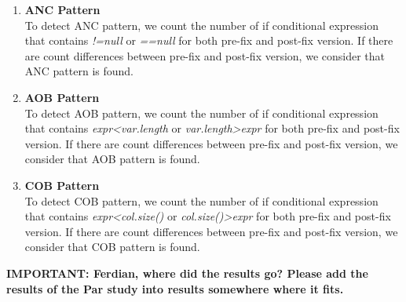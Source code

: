 \documentclass{sig-alternate-05-2015}
\newcommand{\todo}[1]
  {{\scriptsize \textbf{\color{red} {#1}}}}
\begin{document}
\begin{enumerate}
\item {\bf ANC Pattern}\\
  To detect ANC pattern, we count the number of if conditional expression that
  contains {\em !=null} or {\em ==null} for both pre-fix and post-fix
  version. If there are count differences between pre-fix and post-fix version,
  we consider that ANC pattern is found.
	
\item {\bf AOB Pattern}\\
  To detect AOB pattern, we count the number of if conditional expression that
  contains {\em expr<var.length} or {\em var.length>expr} for both pre-fix and
  post-fix version. If there are count differences between pre-fix and post-fix
  version, we consider that AOB pattern is found.
  
\item {\bf COB Pattern}\\
To detect COB pattern, we count the number of if conditional expression that
contains {\em expr<col.size()} or {\em col.size()>expr} for both pre-fix and
post-fix version. If there are count differences between pre-fix and post-fix
version, we consider that COB pattern is found.
	
\end{enumerate}
\todo{IMPORTANT: Ferdian, where did the results go?  Please add the results of
  the Par study into results somewhere where it fits.}
\end{document}
